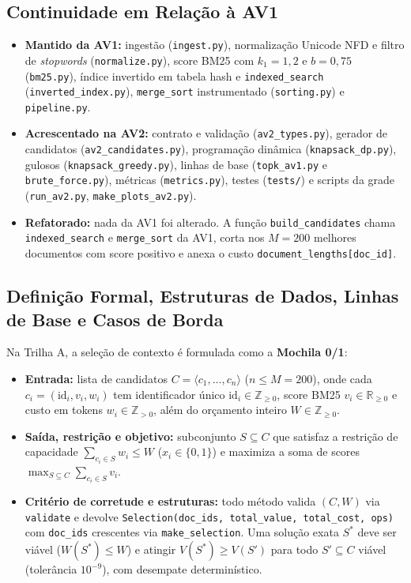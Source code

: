 \subsection{Continuidade em Relação à AV1}
\begin{itemize}
  \item \textbf{Mantido da AV1:} ingestão (\texttt{ingest.py}), normalização Unicode NFD e filtro de \emph{stopwords} (\texttt{normalize.py}), score BM25 com $k_1 = 1{,}2$ e $b = 0{,}75$ (\texttt{bm25.py}), índice invertido em tabela hash e \texttt{indexed\_search} (\texttt{inverted\_index.py}), \texttt{merge\_sort} instrumentado (\texttt{sorting.py}) e \texttt{pipeline.py}.
  \item \textbf{Acrescentado na AV2:} contrato e validação (\texttt{av2\_types.py}), gerador de candidatos (\texttt{av2\_candidates.py}), programação dinâmica (\texttt{knapsack\_dp.py}), gulosos (\texttt{knapsack\_greedy.py}), linhas de base (\texttt{topk\_av1.py} e \texttt{brute\_force.py}), métricas (\texttt{metrics.py}), testes (\texttt{tests/}) e scripts da grade (\texttt{run\_av2.py}, \texttt{make\_plots\_av2.py}).
  \item \textbf{Refatorado:} nada da AV1 foi alterado. A função \texttt{build\_candidates} chama \texttt{indexed\_search} e \texttt{merge\_sort} da AV1, corta nos $M = 200$ melhores documentos com score positivo e anexa o custo \texttt{document\_lengths[doc\_id]}.
\end{itemize}

\subsection{Definição Formal, Estruturas de Dados, Linhas de Base e Casos de Borda}
Na Trilha A, a seleção de contexto é formulada como a \textbf{Mochila 0/1}:
\begin{itemize}
  \item \textbf{Entrada:} lista de candidatos $C = \langle c_1, \dots, c_n \rangle$ ($n \le M = 200$), onde cada $c_i = (\text{id}_i, v_i, w_i)$ tem identificador único $\text{id}_i \in \mathbb{Z}_{\ge 0}$, score BM25 $v_i \in \mathbb{R}_{\ge 0}$ e custo em tokens $w_i \in \mathbb{Z}_{> 0}$, além do orçamento inteiro $W \in \mathbb{Z}_{\ge 0}$.
  \item \textbf{Saída, restrição e objetivo:} subconjunto $S \subseteq C$ que satisfaz a restrição de capacidade $\sum_{c_i \in S} w_i \le W$ ($x_i \in \{0,1\}$) e maximiza a soma de scores $\max_{S \subseteq C} \sum_{c_i \in S} v_i$.
  \item \textbf{Critério de corretude e estruturas:} todo método valida $(C, W)$ via \texttt{validate} e devolve \texttt{Selection(doc\_ids, total\_value, total\_cost, ops)} com \texttt{doc\_ids} crescentes via \texttt{make\_selection}. Uma solução exata $S^*$ deve ser viável ($W(S^*) \le W$) e atingir $V(S^*) \ge V(S')$ para todo $S' \subseteq C$ viável (tolerância $10^{-9}$), com desempate determinístico.
\end{itemize}

